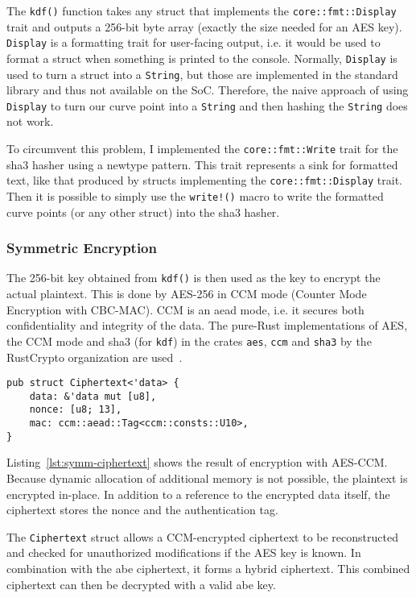 The \verb+kdf()+ function takes any struct that implements the \texttt{core::fmt::Display} trait and outputs a 256-bit byte array (exactly the size needed for an AES key).
\texttt{Display} is a formatting trait for user-facing output, i.e. it would be used to format a struct when something is printed to the console.
Normally, \texttt{Display} is used to turn a struct into a \verb+String+, but those are implemented in the standard library and thus not available on the SoC.
Therefore, the naive approach of using \texttt{Display} to turn our curve point into a \texttt{String} and then hashing the \texttt{String} does not work.

To circumvent this problem, I implemented the \verb+core::fmt::Write+ trait for the \acrshort{sha3} hasher using a newtype pattern.
This trait represents a sink for formatted text, like that produced by structs implementing the \verb+core::fmt::Display+ trait.
Then it is possible to simply use the \verb+write!()+ macro to write the formatted curve points (or any other struct) into the \acrshort{sha3} hasher.

\subsubsection{Symmetric Encryption}

The 256-bit key obtained from \texttt{kdf()} is then used as the key to encrypt the actual plaintext.
This is done by AES-256 in CCM mode (Counter Mode Encryption with CBC-MAC).
CCM is an \acrshort{aead} mode, i.e. it secures both confidentiality and integrity of the data.
The pure-Rust implementations of AES, the CCM mode and \acrshort{sha3} (for \texttt{kdf}) in the crates \texttt{aes}, \texttt{ccm} and \texttt{sha3} by the RustCrypto organization are used~\cite{noauthor_rustcrypto_nodate}.

\begin{lstlisting}[caption={Symmetric Ciphertext struct},label={lst:symm-ciphertext}]
pub struct Ciphertext<'data> {
    data: &'data mut [u8],
    nonce: [u8; 13],
    mac: ccm::aead::Tag<ccm::consts::U10>,
}
\end{lstlisting}

Listing~\ref{lst:symm-ciphertext} shows the result of encryption with AES-CCM.
Because dynamic allocation of additional memory is not possible, the plaintext is encrypted in-place.
In addition to a reference to the encrypted data itself, the ciphertext stores the nonce and the authentication tag.

The \texttt{Ciphertext} struct allows a CCM-encrypted ciphertext to be reconstructed and checked for unauthorized modifications if the AES key is known.
In combination with the \acrshort{abe} ciphertext, it forms a hybrid ciphertext.
This combined ciphertext can then be decrypted with a valid \acrshort{abe} key.

